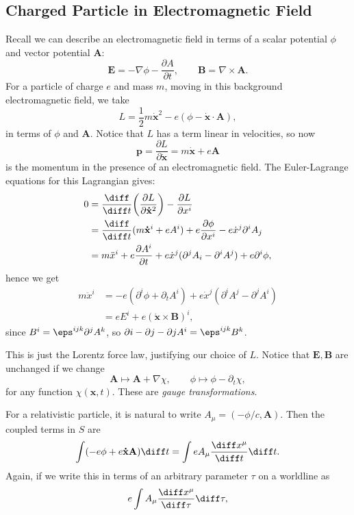 \documentclass[12pt]{article}
\begin{document}

\subsection{Charged Particle in Electromagnetic Field}
\label{sub:l_charged}

Recall we can describe an electromagnetic field in terms of a scalar potential $\phi$ and vector potential $\mathbf{A}$:
\[
\mathbf{E} = - \nabla \phi - \frac{\partial A}{\partial t}, \qquad \mathbf{B} = \nabla \times \mathbf{A}.
\]
For a particle of charge $e$ and mass $m$, moving in this background electromagnetic field, we take
\[
L = \frac{1}{2}m \mathbf{\dot x}^2 - e(\phi - \mathbf{\dot x} \cdot \mathbf{A}),
\]
in terms of $\phi$ and $\mathbf{A}$. Notice that $L$ has a term linear in velocities, so now
\[
\mathbf{p} = \frac{\partial L}{\partial \mathbf{\dot x}} = m \mathbf{\dot x} + e \mathbf{A}
\]
is the momentum in the presence of an electromagnetic field. The Euler-Lagrange equations for this Lagrangian gives:
\begin{align*}
	0 &= \frac{\diff}{\diff t} \biggl( \frac{\partial L}{\partial \mathbf{\dot x}^2} \biggr) - \frac{\partial L}{\partial x^i} \\
	  &= \frac{\diff}{\diff t} (m \mathbf{\dot x}^i + e A^i) + e \frac{\partial \phi}{\partial x^i} - e \dot x^j \partial^i A_j \\
	  &= m \ddot x^i + e \frac{\partial A^i}{\partial t} + e \dot x^j (\partial^j A_i - \partial^i A^j) + e\partial^i \phi,
\end{align*}
hence we get
\begin{align*}
	m \ddot x^i &= -e(\partial^i \phi + \partial_t A^i) + e \dot x^j (\partial^i A^j - \partial^j A^i) \\
		    &= e E^i + e(\mathbf{\dot x} \times \mathbf{B})^i,
\end{align*}
since $B^i = \eps^{ijk} \partial^j A^k$, so $\partial i - \partial j - \partial j A^i = \eps^{ijk} B^k$.

This is just the Lorentz force law, justifying our choice of $L$. Notice that $\mathbf{E}, \mathbf{B}$ are unchanged if we change
\[
\mathbf{A} \mapsto \mathbf{A} + \nabla \chi, \qquad \phi \mapsto \phi - \partial_t \chi,
\]
for any function $\chi(\mathbf{x}, t)$. These are \emph{gauge transformations}.

For a relativistic particle, it is natural to write $A_\mu = (-\phi/c, \mathbf{A})$. Then the coupled terms in $S$ are
\[
\int(-e\phi + e \mathbf{\dot x} \mathbf{A}) \diff t = \int e A_\mu \frac{\diff x^\mu}{\diff t} \diff t.
\]
Again, if we write this in terms of an arbitrary parameter $\tau$ on a worldline as
\[
e \int A_\mu \frac{\diff x^\mu}{\diff \tau} \diff \tau,
\]
\end{document}
